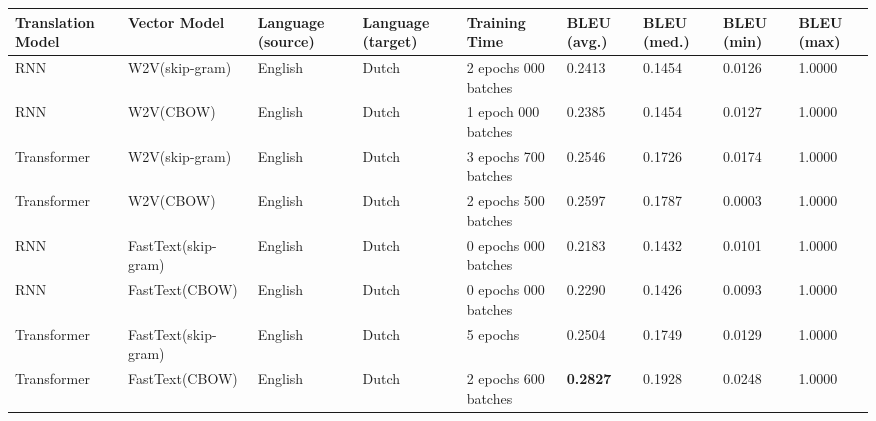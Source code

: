 \documentclass{article}
\begin{document}
\begin{table}
  \begin{center}
    \begin{tabular}{p{2cm}|p{2cm}|p{2cm}|p{2cm}|p{2.5cm}|p{1.5cm}|p{1.5cm}|p{1.5cm}|p{1.5cm}}
        \textbf{Translation Model} & \textbf{Vector Model} & \textbf{Language (source)} & \textbf{Language (target)} & \textbf{Training Time} & \textbf{BLEU (avg.)} & \textbf{BLEU (med.)} & \textbf{BLEU (min)} & \textbf{BLEU (max)}\\
        \hline
        RNN         & W2V\newline (skip-gram)      & English & Dutch   & 2 epochs\newline 260 000 batches & 0.2413 & 0.1454 & 0.0126 & 1.0000\\
        RNN         & W2V\newline (CBOW)           & English & Dutch   & 1 epoch\newline 415 000 batches  & 0.2385 & 0.1454 & 0.0127 & 1.0000\\
        Transformer & W2V\newline (skip-gram)      & English & Dutch   & 3 epochs\newline 375 700 batches & 0.2546 & 0.1726 & 0.0174 & 1.0000\\
        Transformer & W2V\newline (CBOW)           & English & Dutch   & 2 epochs\newline 40 500 batches  & 0.2597 & 0.1787 & 0.0003 & 1.0000\\
        RNN         & FastText\newline (skip-gram) & English & Dutch   & 0 epochs\newline 663 000 batches & 0.2183 & 0.1432 & 0.0101 & 1.0000\\
        RNN         & FastText\newline (CBOW)      & English & Dutch   & 0 epochs\newline 262 000 batches & 0.2290 & 0.1426 & 0.0093 & 1.0000\\
        Transformer & FastText\newline (skip-gram) & English & Dutch   & 5 epochs                         & 0.2504 & 0.1749 & 0.0129 & 1.0000\\
        Transformer & FastText\newline (CBOW)      & English & Dutch   & 2 epochs\newline 854 600 batches & \textbf{0.2827} & 0.1928 & 0.0248 & 1.0000\\

\end{tabular}
\end{center}
\end{table}
\end{document}

